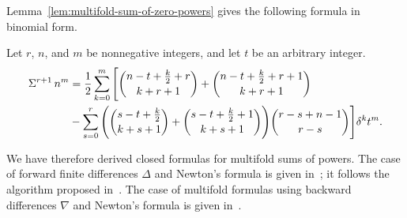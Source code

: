 Lemma~\eqref{lem:multifold-sum-of-zero-powers} gives the following formula in binomial form.
\begin{proposition}
  \label{prop:multifold-binomial-sums-of-powers}
  Let $r$, $n$, and $m$ be nonnegative integers, and let $t$ be an arbitrary integer.
  \begin{align*}
    \Sigma^{r+1}\,{n}^{m}
    &= \frac{1}{2}
    \sum_{k=0}^{m}
    \Bigg[
      \binom{n-t+\frac{k}{2}+r}{k+r+1}
      +
      \binom{n-t+\frac{k}{2}+r+1}{k+r+1} \\
      &-
      \sum_{s=0}^{r}
      \Bigg(
        \binom{s-t+\frac{k}{2}}{k+s+1}
        +
        \binom{s-t+\frac{k}{2}+1}{k+s+1}
      \Bigg) \binom{r-s+n-1}{r-s}
    \Bigg] \delta^{k} t^{m}.
  \end{align*}
\end{proposition}
We have therefore derived closed formulas for multifold sums of powers.
The case of forward finite differences $\Delta$ and Newton's formula is given in~\cite{kolosov2026interpolation}; it follows the algorithm proposed in~\cite[Alg.~(11.2)]{kolosov2026framework}.
The case of multifold formulas using backward differences $\nabla$ and Newton's formula is given in~\cite{kolosov2026backward}.
